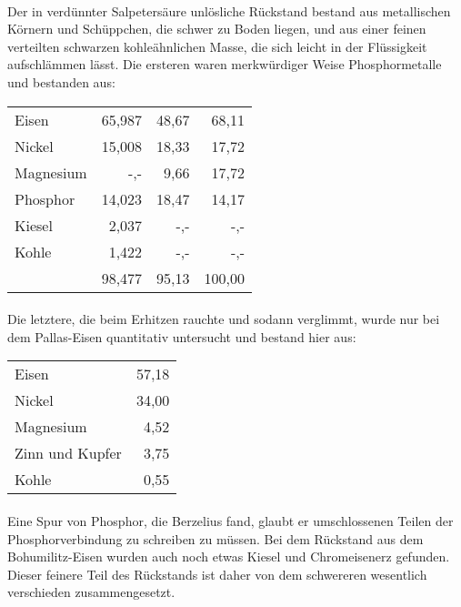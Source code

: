 \documentclass[a4paper, 11pt, oneside]{article}
\begin{document}
\paragraph{}
Der in verdünnter Salpetersäure unlösliche Rückstand bestand aus metallischen Körnern und Schüppchen, die schwer zu Boden liegen, und aus einer feinen verteilten schwarzen kohleähnlichen Masse, die sich leicht in der Flüssigkeit aufschlämmen lässt. Die ersteren waren merkwürdiger Weise Phosphormetalle und bestanden aus:
\begin{center}
\begin{tabular}{ l r r r }
    Eisen & 65,987 & 48,67 & 68,11\\
    Nickel & 15,008 & 18,33 & 17,72\\
    Magnesium & -,- & 9,66 & 17,72\\
    Phosphor & 14,023 & 18,47 & 14,17\\
    Kiesel & 2,037 & -,- & -,-\\
    Kohle & 1,422 & -,- & -,-\\
     & 98,477 & 95,13 & 100,00\\
\end{tabular}
\end{center}
\paragraph{}
Die letztere, die beim Erhitzen rauchte und sodann verglimmt, wurde nur bei dem Pallas-Eisen quantitativ untersucht und bestand hier aus:
\begin{center}
\begin{tabular}{ l r }
    Eisen & 57,18\\
    Nickel & 34,00\\
    Magnesium & 4,52\\
    Zinn und Kupfer & 3,75\\
    Kohle & 0,55\\
\end{tabular}
\end{center}
\paragraph{}
Eine Spur von Phosphor, die Berzelius fand, glaubt er umschlossenen Teilen der Phosphorverbindung zu schreiben zu müssen. Bei dem Rückstand aus dem Bohumilitz-Eisen wurden auch noch etwas Kiesel und Chromeisenerz gefunden. Dieser feinere Teil des Rückstands ist daher von dem schwereren wesentlich verschieden zusammengesetzt.
\end{document}
